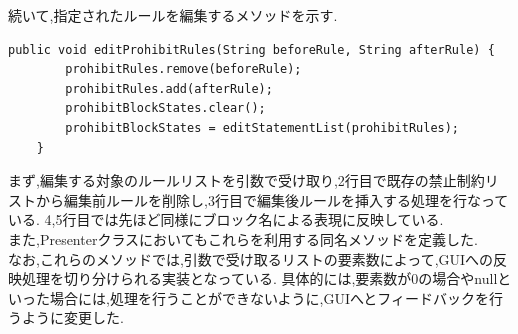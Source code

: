 \documentclass[12pt]{jarticle}
\begin{document}
続いて,指定されたルールを編集するメソッドを示す.
\begin{lstlisting}[caption=editProhibitRulesメソッドの実装, label=mid]
    public void editProhibitRules(String beforeRule, String afterRule) {
		prohibitRules.remove(beforeRule);
		prohibitRules.add(afterRule);
		prohibitBlockStates.clear();
		prohibitBlockStates = editStatementList(prohibitRules);
	}
\end{lstlisting}
まず,編集する対象のルールリストを引数で受け取り,2行目で既存の禁止制約リストから編集前ルールを削除し,3行目で編集後ルールを挿入する処理を行なっている.
4,5行目では先ほど同様にブロック名による表現に反映している. \\

また,Presenterクラスにおいてもこれらを利用する同名メソッドを定義した. \\
なお,これらのメソッドでは,引数で受け取るリストの要素数によって,GUIへの反映処理を切り分けられる実装となっている.
具体的には,要素数が0の場合やnullといった場合には,処理を行うことができないように,GUIへとフィードバックを行うように変更した.
\end{document}
